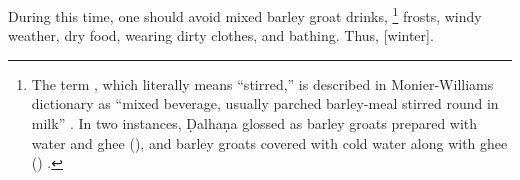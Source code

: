 \begin{translation}
%
%

\item[35] %
During this time, %
one should avoid mixed barley groat drinks,%
	\footnote{The term , which literally means ``stirred,'' is described in Monier-Williams dictionary as ``mixed beverage, usually parched barley-meal stirred round in milk'' \citep[s.\,v.]{moni-sans}. In two instances, Ḍalhaṇa  glossed  as barley groats prepared with water and ghee (), and barley groats covered with cold water along with ghee () \citep[811 and 779]{vulgate}.} %
%
frosts, windy weather, dry food, wearing dirty clothes, and bathing. %
%
Thus, [winter].


\end{translation}
